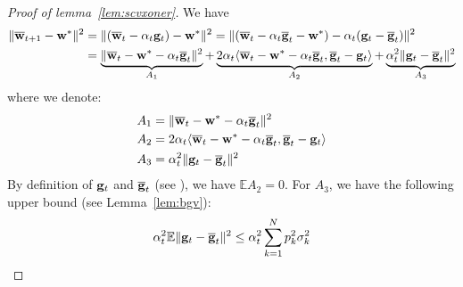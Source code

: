 \begin{proof}[Proof of lemma~\ref{lem:scvxoner}]
	We have 
	\begin{align*}
	\|{\overline{\mathbf{w}}}_{t+1}-{\mathbf{w}}^{\ast}\|^{2} & =\|({\overline{\mathbf{w}}}_{t}-\alpha_{t}{\mathbf{g}}_{t})-{\mathbf{w}}^{\ast}\|^{2} =\|({\overline{\mathbf{w}}}_{t}-\alpha_{t}{\overline{\mathbf{g}}}_{t}-{\mathbf{w}}^{\ast})-\alpha_{t}({\mathbf{g}}_{t}-{\overline{\mathbf{g}}}_{t})\|^{2}\\
	& = \underbrace{\|{\overline{\mathbf{w}}}_{t}-{\mathbf{w}}^{\ast}-\alpha_{t}{\overline{\mathbf{g}}}_{t}\|^{2}}_{A_1} + \underbrace{2\alpha_{t}\langle{\overline{\mathbf{w}}}_{t}-{\mathbf{w}}^{\ast}-\alpha_{t}{\overline{\mathbf{g}}}_{t},{\overline{\mathbf{g}}}_{t}-{\mathbf{g}}_{t}\rangle}_{A_2} + \underbrace{\alpha_{t}^{2}\|{\mathbf{g}}_{t}-{\overline{\mathbf{g}}}_{t}\|^{2}}_{A_3}
	\end{align*}
	where we denote: 
	\begin{align*}
	A_{1} & =\|{\overline{\mathbf{w}}}_{t}-{\mathbf{w}}^{\ast}-\alpha_{t}{\overline{\mathbf{g}}}_{t}\|^{2}\\
	A_{2} & =2\alpha_{t}\langle{\overline{\mathbf{w}}}_{t}-{\mathbf{w}}^{\ast}-\alpha_{t}{\overline{\mathbf{g}}}_{t},{\overline{\mathbf{g}}}_{t}-{\mathbf{g}}_{t}\rangle\\
	A_{3} & =\alpha_{t}^{2}\|{\mathbf{g}}_{t}-{\overline{\mathbf{g}}}_{t}\|^{2}
	\end{align*}
	By definition of ${\mathbf{g}}_{t}$ and ${\overline{\mathbf{g}}}_{t}$ (see \eq{\ref{eq:gradient}}), we have $\mathbb{E}A_{2}=0$.
	For $A_{3}$, we have the following upper bound (see Lemma~\ref{lem:bgv}):
	\begin{align*}
	\alpha_{t}^{2}\mathbb{E}\|{\mathbf{g}}_{t}-{\overline{\mathbf{g}}}_{t}\|^{2} \leq\alpha_{t}^{2}\sum_{k=1}^{N}p_{k}^{2}\sigma_{k}^{2}
	\end{align*} 
	

\end{proof}
